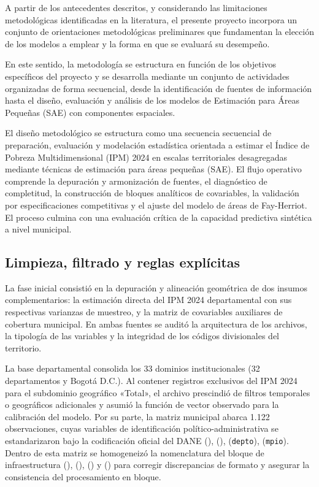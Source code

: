 A partir de los antecedentes descritos, y considerando las limitaciones metodológicas identificadas en la
literatura, el presente proyecto incorpora un conjunto de orientaciones metodológicas preliminares que
fundamentan la elección de los modelos a emplear y la forma en que se evaluará su desempeño.

En este sentido, la metodología se estructura en función de los objetivos específicos del proyecto y se desarrolla mediante un conjunto de actividades organizadas de forma secuencial, desde la identificación de fuentes de información hasta el diseño, evaluación y análisis de los modelos de Estimación para Áreas Pequeñas (SAE) con componentes espaciales.

El diseño metodológico se estructura como una secuencia secuencial de preparación, evaluación y modelación estadística orientada a estimar el Índice de Pobreza Multidimensional (IPM) 2024 en escalas territoriales desagregadas mediante técnicas de estimación para áreas pequeñas (SAE). El flujo operativo comprende la depuración y armonización de fuentes, el diagnóstico de completitud, la construcción de bloques analíticos de covariables, la validación por especificaciones competitivas y el ajuste del modelo de áreas de Fay-Herriot. El proceso culmina con una evaluación crítica de la capacidad predictiva sintética a nivel municipal.

\subsection{Limpieza, filtrado y reglas explícitas}
La fase inicial consistió en la depuración y alineación geométrica de dos insumos complementarios: la estimación directa del IPM 2024 departamental con sus respectivas varianzas de muestreo, y la matriz de covariables auxiliares de cobertura municipal. En ambas fuentes se auditó la arquitectura de los archivos, la tipología de las variables y la integridad de los códigos divisionales del territorio.

La base departamental consolida los 33 dominios institucionales (32 departamentos y Bogotá D.C.). Al contener registros exclusivos del IPM 2024 para el subdominio geográfico «Total», el archivo prescindió de filtros temporales o geográficos adicionales y asumió la función de vector observado para la calibración del modelo. Por su parte, la matriz municipal abarca 1.122 observaciones, cuyas variables de identificación político-administrativa se estandarizaron bajo la codificación oficial del DANE (\texttt{}), (\texttt{}), (\texttt{depto}), (\texttt{mpio}). Dentro de esta matriz se homogeneizó la nomenclatura del bloque de infraestructura (\texttt{}), (\texttt{}), (\texttt{}) y (\texttt{}) para corregir discrepancias de formato y asegurar la consistencia del procesamiento en bloque.

